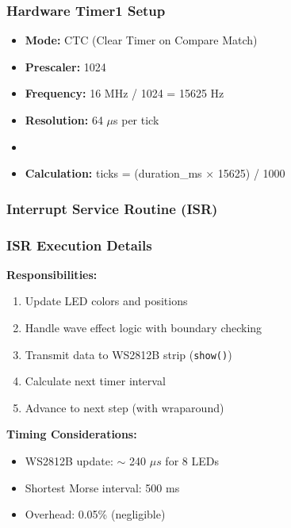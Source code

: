 \documentclass[aspectratio=169, 8pt]{beamer}
\begin{document}
	\begin{frame}[fragile,shrink=10]
		\frametitle{Hardware Timer1 Setup}
		\begin{itemize}
			\item \textbf{Mode:} CTC (Clear Timer on Compare Match)
			\item \textbf{Prescaler:} 1024
			\item \textbf{Frequency:} 16 MHz / 1024 = 15625 Hz
			\item \textbf{Resolution:} 64 $\mu$s per tick
			\item[]     
			\item \textbf{Calculation:} ticks = (duration\_ms × 15625) / 1000
		\end{itemize}
		
	\end{frame}
	
	\begin{frame}[fragile,shrink=10]
		\frametitle{Interrupt Service Routine (ISR)}
		\vspace{0.5cm}
		
	\end{frame}
	
	\begin{frame}[fragile,shrink=10]
		\frametitle{ISR Execution Details}
		\textbf{Responsibilities:}
		\begin{enumerate}
			\item Update LED colors and positions
			\item Handle wave effect logic with boundary checking
			\item Transmit data to WS2812B strip (\texttt{show()})
			\item Calculate next timer interval
			\item Advance to next step (with wraparound)
		\end{enumerate}
		
		\vspace{0.5cm}
		\textbf{Timing Considerations:}
		\begin{itemize}
			\item WS2812B update: $\sim$ 240 $\mu s$ for 8 LEDs
			\item Shortest Morse interval: 500 ms
			\item Overhead: 0.05\% (negligible)
		\end{itemize}
	\end{frame}
	
\end{document}
